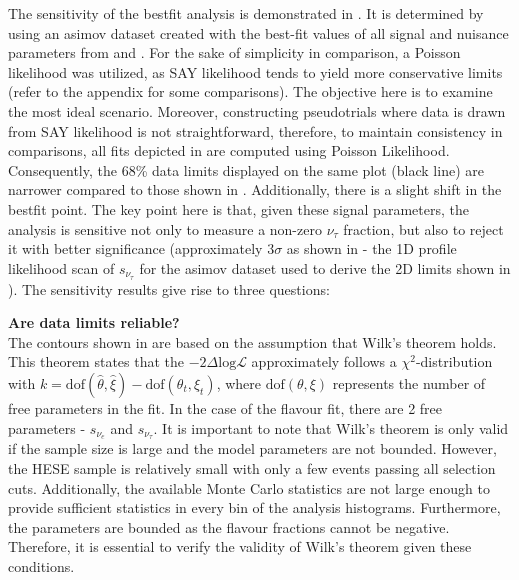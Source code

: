 The sensitivity of the bestfit analysis is demonstrated in . It is determined by using an asimov dataset  created with the best-fit values of all signal and nuisance parameters from  and . For the sake of simplicity in comparison, a Poisson likelihood was utilized, as SAY likelihood tends to yield more conservative limits (refer to the appendix for some comparisons). The objective here is to examine the most ideal scenario. Moreover, constructing pseudotrials where data is drawn from SAY likelihood is not straightforward, therefore, to maintain consistency in comparisons, all fits depicted in  are computed using Poisson Likelihood. Consequently, the 68\% data limits displayed on the same plot (black line) are narrower compared to those shown in . Additionally, there is a slight shift in the bestfit point. The key point here is that, given these signal parameters, the analysis is sensitive not only to measure a non-zero $\nu_{\tau}$ fraction, but also to reject it with better significance (approximately $3\sigma$ as shown in  - the 1D profile likelihood scan of $s_{\nu_{\tau}}$ for the asimov dataset used to derive the 2D limits shown in ). The sensitivity results give rise to three questions:

\textbf{Are data limits reliable?}\\
The contours shown in  are based on the assumption that Wilk's theorem holds. This theorem states that the $-2\Delta\mathrm{log}\mathcal{L}$ approximately follows a $\chi^2$-distribution with $k = \text{dof}(\hat{\theta}, \hat{\xi}) - \text{dof}(\theta_t, \xi_t)$, where $\text{dof}(\theta, \xi)$ represents the number of free parameters in the fit. In the case of the flavour fit, there are 2 free parameters - $s_{\nu_{e}}$ and $s_{\nu_{\tau}}$. It is important to note that Wilk's theorem is only valid if the sample size is large and the model parameters are not bounded. However, the HESE sample is relatively small with only a few events passing all selection cuts. Additionally, the available Monte Carlo statistics are not large enough to provide sufficient statistics in every bin of the analysis histograms. Furthermore, the parameters are bounded as the flavour fractions cannot be negative. Therefore, it is essential to verify the validity of Wilk's theorem given these conditions. 


